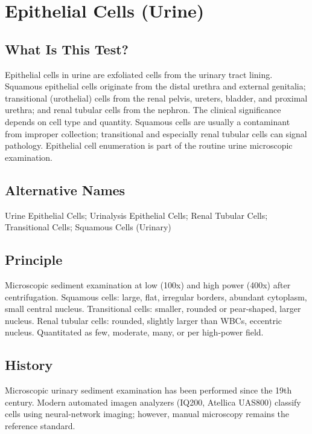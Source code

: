 \chapter{Epithelial Cells (Urine)}

\section*{What Is This Test?}
Epithelial cells in urine are exfoliated cells from the urinary tract lining. Squamous epithelial cells originate from the distal urethra and external genitalia; transitional (urothelial) cells from the renal pelvis, ureters, bladder, and proximal urethra; and renal tubular cells from the nephron. The clinical significance depends on cell type and quantity. Squamous cells are usually a contaminant from improper collection; transitional and especially renal tubular cells can signal pathology. Epithelial cell enumeration is part of the routine urine microscopic examination.

\section*{Alternative Names}
Urine Epithelial Cells; Urinalysis Epithelial Cells; Renal Tubular Cells; Transitional Cells; Squamous Cells (Urinary)

\section*{Principle}
Microscopic sediment examination at low (100x) and high power (400x) after centrifugation. Squamous cells: large, flat, irregular borders, abundant cytoplasm, small central nucleus. Transitional cells: smaller, rounded or pear-shaped, larger nucleus. Renal tubular cells: rounded, slightly larger than WBCs, eccentric nucleus. Quantitated as few, moderate, many, or per high-power field.

\section*{History}
Microscopic urinary sediment examination has been performed since the 19th century. Modern automated imagen analyzers (IQ200, Atellica UAS800) classify cells using neural-network imaging; however, manual microscopy remains the reference standard.

